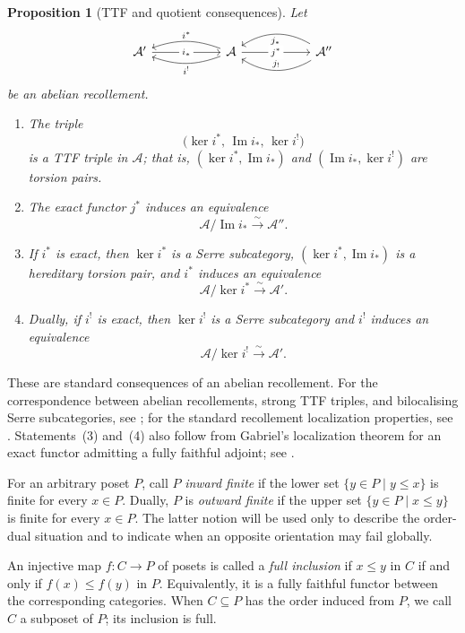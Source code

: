 \documentclass[12pt,reqno]{amsart}
\newtheorem{proposition}[theorem]{Proposition}
\theoremstyle{definition}
\theoremstyle{remark}
\begin{document}
\begin{proposition}[TTF and quotient consequences]\label{prop:recollement-ttf}
Let
\[
\begin{tikzcd}[column sep=5.5em]
\mathcal A'
  \arrow[r, "i_*" description]
&
\mathcal A
  \arrow[l, bend right=20, "i^*"']
  \arrow[l, bend left=20, "i^!"]
  \arrow[r, "j^*" description]
&
\mathcal A''
  \arrow[l, bend left=32, "j_!"']
  \arrow[l, bend right=32, "j_*"]
\end{tikzcd}
\]
be an abelian recollement.
\begin{enumerate}[label=\rm(\arabic*)]
\item The triple
\[
\bigl(\ker i^*,\,\operatorname{Im}i_*,\,\ker i^!\bigr)
\]
is a TTF triple in $\mathcal A$; that is,
$(\ker i^*,\operatorname{Im}i_*)$ and
$(\operatorname{Im}i_*,\ker i^!)$ are torsion pairs.
\item The exact functor $j^*$ induces an equivalence
\[
\mathcal A/\operatorname{Im}i_*
\xrightarrow{\sim}
\mathcal A''.
\]
\item If $i^*$ is exact, then $\ker i^*$ is a Serre subcategory,
$(\ker i^*,\operatorname{Im}i_*)$ is a hereditary torsion pair, and
$i^*$ induces an equivalence
\[
\mathcal A/\ker i^*
\xrightarrow{\sim}
\mathcal A'.
\]
\item Dually, if $i^!$ is exact, then $\ker i^!$ is a Serre subcategory and
$i^!$ induces an equivalence
\[
\mathcal A/\ker i^!
\xrightarrow{\sim}
\mathcal A'.
\]
\end{enumerate}
\end{proposition}

These are standard consequences of an abelian recollement.  For the
correspondence between abelian recollements, strong TTF triples, and
bilocalising Serre subcategories, see \cite[Theorem~4.3]{PV}; for the standard
recollement localization properties, see \cite[Section~2]{Psaroudakis}.
Statements~(3) and~(4) also follow from Gabriel's localization theorem for
an exact functor admitting a fully faithful adjoint; see \cite{Gabriel}.

For an arbitrary poset $P$, call $P$ \emph{inward finite} if the lower set
$\{y\in P\mid y\le x\}$ is finite for every $x\in P$.  Dually, $P$ is
\emph{outward finite} if the upper set $\{y\in P\mid x\le y\}$ is finite for
every $x\in P$.  The latter notion will be used only to describe the
order-dual situation and to indicate when an opposite orientation may fail
globally.

An injective map $f:C\to P$ of posets is called a \emph{full inclusion} if
$x\le y$ in $C$ if and only if $f(x)\le f(y)$ in $P$.  Equivalently, it is a
fully faithful functor between the corresponding categories.  When
$C\subseteq P$ has the order induced from $P$, we call $C$ a subposet of $P$;
its inclusion is full.
\end{document}
